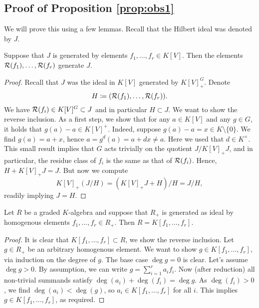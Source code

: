 \documentclass[../main.tex]{subfiles}
\begin{document}
\subsection{Proof of Proposition \ref{prop:obs1}} %
\label{sub:Proofs of proposition 8}
We will prove this using a few lemmas.
Recall that the Hilbert ideal was denoted by $J$.
\begin{lem}\label{lem:8.1}
    Suppose that $J$ is generated by elements $f_1, \dots, f_r \in K[V]$. Then
    the elements
    $\mathcal{R}(f_1), \dots, \mathcal{R}(f_r)$ generate $J$.
\begin{proof}
    Recall that $J$ was the ideal in $K[V]$ generated by $K[V]^G_+$. 
    Denote $$H \coloneqq (\mathcal{R}(f_1), \dots, \mathcal{R}(f_r)).$$ We have $\mathcal{R}(f_i) \in
    K[V]^G\subset J$ and in particular $H \subset J$. We want to show the
    reverse inclusion. As a first step, we show that for any 
    $a \in K[V]$ and any $g \in G$, it holds that $g(a) - a \in K[V]^+$. 
    Indeed, suppose $g(a) - a = x \in K\setminus\{0\}$. We find $g(a) = a + x$, hence
    $a = g^d(a) = a + dx \neq a$. Here we used that $d \in K^\times$. This small
    result implies that $G$ acts trivially on the quotient $J/K[V]_+ J$, and in particular,
    the residue class of $f_i$ is the same as that of $\mathcal{R}(f_i)$. Hence, 
    $H + K[V]_+ J = J$. But now we compute
    \begin{equation*}
        K[V]_+(J/H) = (K[V]_+ J + H)/H = J/H,
    \end{equation*}
    readily implying $J = H$.
\end{proof}

\begin{lem}
    Let $R$ be a graded $K$-algebra and suppose that $R_{+}$ is generated 
    as ideal by homogenous elements $f_1, \dots, f_r \in R_+$. Then $R = K[f_1,
    \dots, f_r]$.
\begin{proof}
    It is clear that $K[f_1, \dots, f_r] \subset R$, we show the reverse inclusion.
    Let $g \in R_+$ be an arbitrary homogenous element. 
    We want to show $g \in K[f_1, \dots, f_r]$, via induction on the degree of $g$.
    The base case $\deg g = 0$ is clear. Let's assume $\deg g > 0$. By assumption,
    we can write $g = \sum_{i=1}^r a_i f_i$. Now (after reduction) all
    non-trivial summands satisfy $\deg(a_i) + \deg(f_i) = \deg g$. As
    $\deg(f_i) > 0$, we find $\deg(a_i) < \deg (g)$, so $a_i \in K[f_1, \dots, f_r]$ 
    for all $i$. This implies $g \in K[f_1, \dots, f_r]$, as required.
\end{proof}
\end{lem}

\end{lem}
\end{document}
